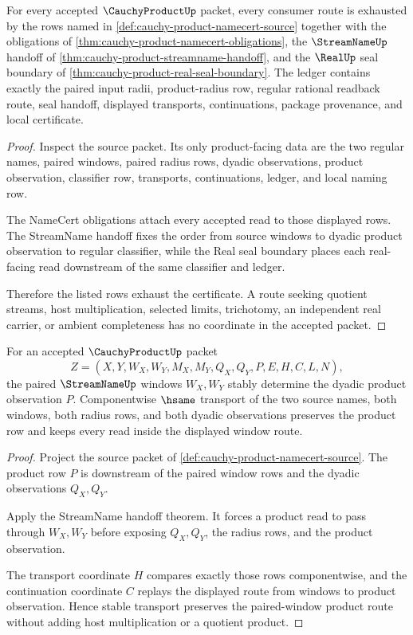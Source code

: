 \begin{theorem}
\label{thm:cauchy-product-ledger-exhaustion}
For every accepted $\CauchyProductUp$ packet, every consumer route is exhausted by the rows named in \autoref{def:cauchy-product-namecert-source} together with the obligations of \autoref{thm:cauchy-product-namecert-obligations}, the $\StreamNameUp$ handoff of \autoref{thm:cauchy-product-streamname-handoff}, and the $\RealUp$ seal boundary of \autoref{thm:cauchy-product-real-seal-boundary}. The ledger contains exactly the paired input radii, product-radius row, regular rational readback route, seal handoff, displayed transports, continuations, package provenance, and local certificate.
\end{theorem}
\begin{proof}
Inspect the source packet. Its only product-facing data are the two regular names, paired windows, paired radius rows, dyadic observations, product observation, classifier row, transports, continuations, ledger, and local naming row.

The NameCert obligations attach every accepted read to those displayed rows. The StreamName handoff fixes the order from source windows to dyadic product observation to regular classifier, while the Real seal boundary places each real-facing read downstream of the same classifier and ledger.

Therefore the listed rows exhaust the certificate. A route seeking quotient streams, host multiplication, selected limits, trichotomy, an independent real carrier, or ambient completeness has no coordinate in the accepted packet.
\end{proof}

\begin{theorem}
\label{thm:cauchy-product-window-product-stability}
For an accepted $\CauchyProductUp$ packet
$$
Z=(X,Y,W_X,W_Y,M_X,M_Y,Q_X,Q_Y,P,E,H,C,L,N),
$$
the paired $\StreamNameUp$ windows $W_X,W_Y$ stably determine the dyadic product observation $P$. Componentwise $\hsame$ transport of the two source names, both windows, both radius rows, and both dyadic observations preserves the product row and keeps every read inside the displayed window route.
\end{theorem}
\begin{proof}
Project the source packet of \autoref{def:cauchy-product-namecert-source}. The product row $P$ is downstream of the paired window rows and the dyadic observations $Q_X,Q_Y$.

Apply the StreamName handoff theorem. It forces a product read to pass through $W_X,W_Y$ before exposing $Q_X,Q_Y$, the radius rows, and the product observation.

The transport coordinate $H$ compares exactly those rows componentwise, and the continuation coordinate $C$ replays the displayed route from windows to product observation. Hence stable transport preserves the paired-window product route without adding host multiplication or a quotient product.
\end{proof}

